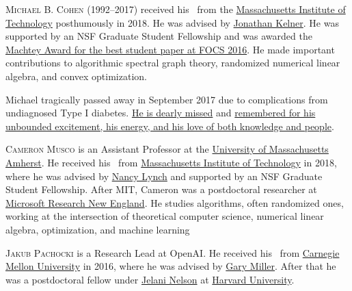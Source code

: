 \documentclass{toc}
\begin{document}
%
%
%
%
%
%
%
%
%
%
%
%
%
%
\begin{tocaboutauthors}

\begin{tocabout}[cohen]  %
\textsc{Michael B. Cohen (1992--2017)} received his \phd\ from the
\href{http://web.mit.edu/}{Massachusetts Institute of Technology}
posthumously in 2018.
He was advised  %
by \href{https://math.mit.edu/~kelner/}{Jonathan Kelner}. 
He was supported by an NSF Graduate Student Fellowship and was awarded 
the \href{https://www.computer.org/csdl/pds/api/csdl/proceedings/download-article/12OmNCdk2R8/pdf}{Machtey Award for the best student paper at FOCS 2016}.
He made important contributions %
to %
algorithmic spectral graph theory, 
randomized numerical linear algebra, and convex optimization.

\noindent
Michael tragically passed away in September 2017 due to complications 
from undiagnosed Type I diabetes. 
\href{https://simons.berkeley.edu/news/memoriam-michael-cohen}{He is 
dearly missed} 
and \href{https://news.mit.edu/2017/celebrating-life-of-doctoral-student-and-alumnus-michael-b-cohen-1005}{remembered for his unbounded excitement, 
his energy, and his love of both knowledge and people}.
\end{tocabout}


\begin{tocabout}[musco]  %
  \textsc{Cameron Musco} is an Assistant Professor at the \href{https://www.cics.umass.edu/}{University of Massachusetts Amherst}. He received his \phd\ from \href{http://web.mit.edu/}{Massachusetts Institute of Technology} in 2018, where he was advised by \href{https://people.csail.mit.edu/lynch/}{Nancy Lynch} and supported by an NSF Graduate Student Fellowship. After MIT, Cameron was a postdoctoral researcher at \href{https://www.microsoft.com/en-us/research/lab/microsoft-research-new-england/}{Microsoft Research New England}. He studies algorithms, often randomized ones, working at the intersection of theoretical computer science, numerical linear algebra, optimization, and machine learning
  \end{tocabout}

\begin{tocabout}[pachocki]  %
  \textsc{Jakub Pachocki} is a Research Lead at OpenAI. He received his \phd\ from \href{https://www.cmu.edu/}{Carnegie Mellon University} in 2016, where he was advised by \href{http://www.cs.cmu.edu/~glmiller/}{Gary Miller}. After that he was a postdoctoral fellow under \href{https://people.eecs.berkeley.edu/~minilek/}{Jelani Nelson} at \href{https://www.harvard.edu/}{Harvard University}. 
  \end{tocabout}
  
\end{tocaboutauthors}
\end{document}
